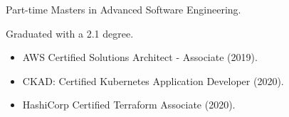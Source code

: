 \documentclass[10pt,a4paper,ragged2e]{cv}
\begin{document}
Part-time Masters in Advanced Software Engineering.

\divider

\item Graduated with a 2.1 degree.

\begin{itemize}
\item AWS Certified Solutions Architect - Associate (2019).
\item CKAD: Certified Kubernetes Application Developer (2020).
\item HashiCorp Certified Terraform Associate (2020).
\end{itemize}

\clearpage


\nocite{*}
\end{document}
